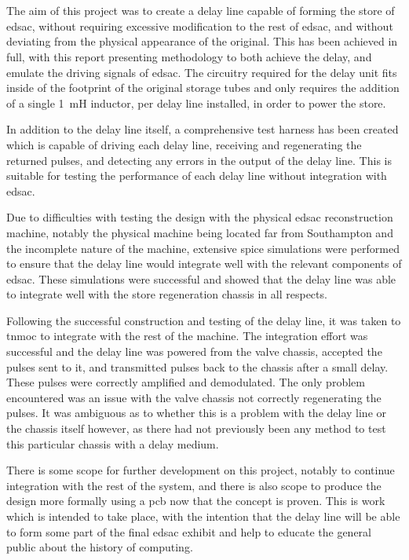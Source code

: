 \chapter{} \label{sec:conclusion}

The aim of this project was to create a delay line capable of forming the store of \gls{edsac}, without requiring excessive modification to the rest of \gls{edsac}, and without deviating from the physical appearance of the original. This has been achieved in full, with this report presenting methodology to both achieve the delay, and emulate the driving signals of \gls{edsac}. The circuitry required for the delay unit fits inside of the footprint of the original storage tubes and only requires the addition of a single \SI{1}{\milli\henry} inductor, per delay line installed, in order to power the store.

In addition to the delay line itself, a comprehensive test harness has been created which is capable of driving each delay line, receiving and regenerating the returned pulses, and detecting any errors in the output of the delay line. This is suitable for testing the performance of each delay line without integration with \gls{edsac}.

Due to difficulties with testing the design with the physical \gls{edsac} reconstruction machine, notably the physical machine being located far from Southampton and the incomplete nature of the machine, extensive \gls{spice} simulations were performed to ensure that the delay line would integrate well with the relevant components of \gls{edsac}. These simulations were successful and showed that the delay line was able to integrate well with the store regeneration chassis in all respects.

Following the successful construction and testing of the delay line, it was taken to \gls{tnmoc} to integrate with the rest of the machine. The integration effort was successful and the delay line was powered from the valve chassis, accepted the pulses sent to it, and transmitted pulses back to the chassis after a small delay. These pulses were correctly amplified and demodulated. The only problem encountered was an issue with the valve chassis not correctly regenerating the pulses. It was ambiguous as to whether this is a problem with the delay line or the chassis itself however, as there had not previously been any method to test this particular chassis with a delay medium.

There is some scope for further development on this project, notably to continue integration with the rest of the system, and there is also scope to produce the design more formally using a \gls{pcb} now that the concept is proven. This is work which is intended to take place, with the intention that the delay line will be able to form some part of the final \gls{edsac} exhibit and help to educate the general public about the history of computing.

